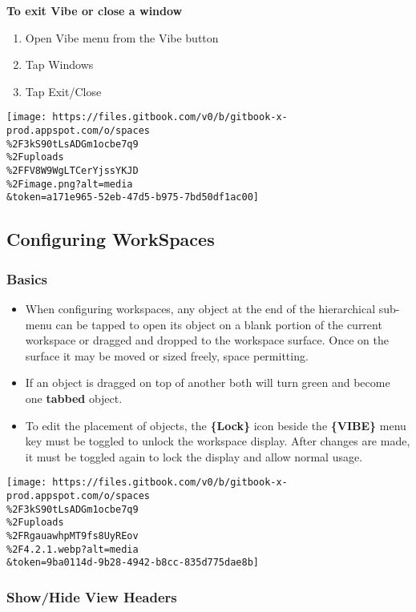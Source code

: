 \documentclass[
]{article}
\begin{document}
\textbf{To exit Vibe or close a window}

\begin{enumerate}
\def\labelenumi{\arabic{enumi}.}
\item
  Open Vibe menu from the Vibe button
\item
  Tap Windows
\item
  Tap Exit/Close
\end{enumerate}

\texttt{[image: https://files.gitbook.com/v0/b/gitbook-x-prod.appspot.com/o/spaces\\\%2F3kS90tLsADGm1ocbe7q9\\\%2Fuploads\\\%2FFV8W9WgLTCerYjssYKJD\\\%2Fimage.png?alt=media\\\&token=a171e965-52eb-47d5-b975-7bd50df1ac00]}

\hypertarget{configuring-workspaces}{%
\subsection{Configuring WorkSpaces}\label{configuring-workspaces}}

\hypertarget{basics}{%
\subsubsection{Basics}\label{basics}}

\begin{itemize}
\item
  When configuring workspaces, any object at the end of the hierarchical sub-menu can be tapped to open its object on a blank portion of the current workspace or dragged and dropped to the workspace surface. Once on the surface it may be moved or sized freely, space permitting.
\item
  If an object is dragged on top of another both will turn green and become one \textbf{tabbed} object.
\item
  To edit the placement of objects, the \textbf{\{Lock\}} icon beside the \textbf{\{VIBE\}} menu key must be toggled to unlock the workspace display. After changes are made, it must be toggled again to lock the display and allow normal usage.
\end{itemize}

\texttt{[image: https://files.gitbook.com/v0/b/gitbook-x-prod.appspot.com/o/spaces\\\%2F3kS90tLsADGm1ocbe7q9\\\%2Fuploads\\\%2FRgauawhpMT9fs8UyREov\\\%2F4.2.1.webp?alt=media\\\&token=9ba0114d-9b28-4942-b8cc-835d775dae8b]}

\hypertarget{showhide-view-headers}{%
\subsubsection{Show/Hide View Headers}\label{showhide-view-headers}}
\end{document}
